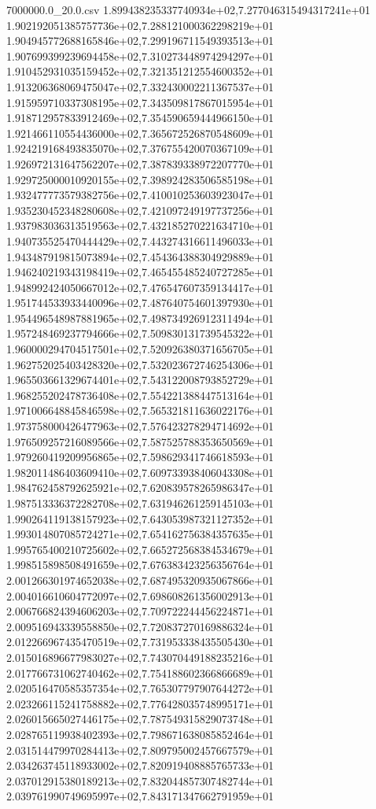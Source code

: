 \begin{filecontents*}{7000000.0_20.0.csv}
1.899438235337740934e+02,7.277046315494317241e+01
1.902192051385757736e+02,7.288121000362298219e+01
1.904945772688165846e+02,7.299196711549393513e+01
1.907699399239694458e+02,7.310273448974294297e+01
1.910452931035159452e+02,7.321351212554600352e+01
1.913206368069475047e+02,7.332430002211367537e+01
1.915959710337308195e+02,7.343509817867015954e+01
1.918712957833912469e+02,7.354590659444966150e+01
1.921466110554436000e+02,7.365672526870548609e+01
1.924219168493835070e+02,7.376755420070367109e+01
1.926972131647562207e+02,7.387839338972207770e+01
1.929725000010920155e+02,7.398924283506585198e+01
1.932477773579382756e+02,7.410010253603923047e+01
1.935230452348280608e+02,7.421097249197737256e+01
1.937983036313519563e+02,7.432185270221634710e+01
1.940735525470444429e+02,7.443274316611496033e+01
1.943487919815073894e+02,7.454364388304929889e+01
1.946240219343198419e+02,7.465455485240727285e+01
1.948992424050667012e+02,7.476547607359134417e+01
1.951744533933440096e+02,7.487640754601397930e+01
1.954496548987881965e+02,7.498734926912311494e+01
1.957248469237794666e+02,7.509830131739545322e+01
1.960000294704517501e+02,7.520926380371656705e+01
1.962752025403428320e+02,7.532023672746254306e+01
1.965503661329674401e+02,7.543122008793852729e+01
1.968255202478736408e+02,7.554221388447513164e+01
1.971006648845846598e+02,7.565321811636022176e+01
1.973758000426477963e+02,7.576423278294714692e+01
1.976509257216089566e+02,7.587525788353650569e+01
1.979260419209956865e+02,7.598629341746618593e+01
1.982011486403609410e+02,7.609733938406043308e+01
1.984762458792625921e+02,7.620839578265986347e+01
1.987513336372282708e+02,7.631946261259145103e+01
1.990264119138157923e+02,7.643053987321127352e+01
1.993014807085724271e+02,7.654162756384357635e+01
1.995765400210725602e+02,7.665272568384534679e+01
1.998515898508491659e+02,7.676383423256356764e+01
2.001266301974652038e+02,7.687495320935067866e+01
2.004016610604772097e+02,7.698608261356002913e+01
2.006766824394606203e+02,7.709722244456224871e+01
2.009516943339558850e+02,7.720837270169886324e+01
2.012266967435470519e+02,7.731953338435505430e+01
2.015016896677983027e+02,7.743070449188235216e+01
2.017766731062740462e+02,7.754188602366866689e+01
2.020516470585357354e+02,7.765307797907644272e+01
2.023266115241758882e+02,7.776428035748995171e+01
2.026015665027446175e+02,7.787549315829073748e+01
2.028765119938402393e+02,7.798671638085852464e+01
2.031514479970284413e+02,7.809795002457667579e+01
2.034263745118933002e+02,7.820919408885765733e+01
2.037012915380189213e+02,7.832044857307482744e+01
2.039761990749695997e+02,7.843171347662791959e+01

\end{filecontents*}
